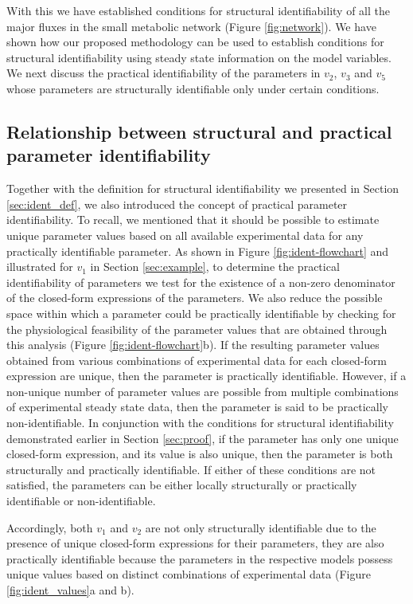 \documentclass[10pt]{article}
\begin{document}
	With this we have established conditions for structural identifiability of all the major fluxes in the small metabolic network (Figure \ref{fig:network}). We have shown how our proposed methodology can be used to establish conditions for structural identifiability using steady state information on the model variables. We next discuss the practical identifiability of the parameters in $v_2$, $v_3$ and $v_5$ whose parameters are structurally identifiable only under certain conditions. 
	
	\subsection{Relationship between structural and practical parameter identifiability}\label{sec:initial_analysis}
	Together with the definition for structural identifiability we presented in Section \ref{sec:ident_def}, we also introduced the concept of practical parameter identifiability. To recall, we mentioned that  it should be possible to estimate unique parameter values based on all available experimental data for any practically identifiable parameter. As shown in Figure \ref{fig:ident-flowchart} and illustrated for $v_1$ in Section \ref{sec:example}, to determine the practical identifiability of parameters we test for the existence of a non-zero denominator of the closed-form expressions of the parameters. We also reduce the possible space within which a parameter could be practically identifiable by checking for the physiological feasibility of the parameter values that are obtained through this analysis (Figure \ref{fig:ident-flowchart}b). If the resulting parameter values obtained from various combinations of experimental data for each closed-form expression are unique, then the parameter is practically identifiable. However, if a non-unique number of parameter values are possible from multiple combinations of experimental steady state data, then the parameter is said to be practically non-identifiable. In conjunction with the conditions for structural identifiability demonstrated earlier in Section \ref{sec:proof}, if the parameter has only one unique closed-form expression, and its value is also unique, then the parameter is both structurally and practically identifiable. If either of these conditions are not satisfied, the parameters can be either locally structurally or practically identifiable or non-identifiable.
	
	Accordingly, both $v_1$ and $v_2$ are not only structurally identifiable due to the presence of unique closed-form expressions for their parameters, they are also practically identifiable because the parameters in the respective models possess unique values based on distinct combinations of experimental data (Figure \ref{fig:ident_values}a and b). 
	
\end{document}
